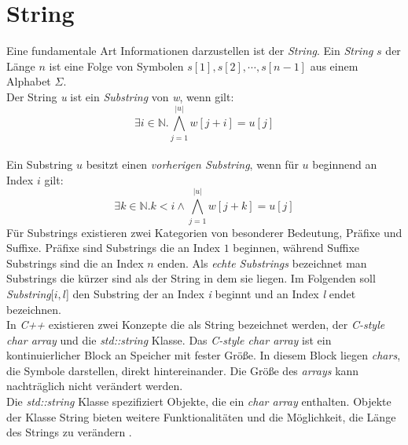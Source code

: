 \section{String}
Eine fundamentale Art Informationen darzustellen ist der \emph{String}.
Ein \emph{String} $s$ der Länge $n$ ist eine
Folge von Symbolen $s[1],s[2],\cdots ,s[n-1]$ aus einem Alphabet $\Sigma$.
\\
Der String \textit{u} ist ein \emph{Substring}  von \textit{w}, wenn 
gilt:
\begin{equation}
\exists i \in  \mathbb{N}.\bigwedge_{j=1}^{|u|} w[j+i]=u[j]
\end{equation}\\
Ein Substring  $u$ besitzt einen \emph{vorherigen Substring}, wenn für $u$ beginnend an Index $i$ gilt:
\begin{equation}
\exists k \in  \mathbb{N}. k<i  \land \bigwedge_{j=1}^{|u|} w[j+k]=u[j]
\end{equation}
Für Substrings  existieren zwei Kategorien von besonderer Bedeutung, Präfixe und Suffixe.
Präfixe sind Substrings  die an Index $1$ beginnen, während Suffixe Substrings  sind die an Index $n$ enden.
Als \emph{echte Substrings}  bezeichnet man Substrings  die kürzer sind als der String  in dem sie liegen.
Im Folgenden soll \emph{Substring}[$i,l$] den Substring  der an Index \textit{i} beginnt und an Index \textit{l} endet bezeichnen.\\
In \textit{C++} existieren zwei Konzepte die als String  bezeichnet werden, der \textit{C-style char array} und die \textit{std::string} Klasse.
Das \textit{C-style char array} ist ein kontinuierlicher Block an Speicher mit fester Größe. In diesem Block liegen \textit{chars}, die Symbole darstellen, direkt hintereinander. Die Größe des \textit{arrays} kann nachträglich nicht verändert werden.\\
Die \textit{std::string} Klasse spezifiziert Objekte, die ein \textit{char array} enthalten. Objekte der Klasse String  bieten weitere Funktionalitäten und die Möglichkeit, die Länge des Strings  zu verändern \cite{cplusplus}.
\newpage
